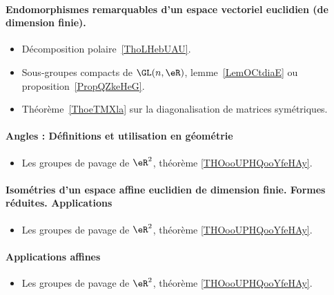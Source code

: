\paragraph{Endomorphismes remarquables d’un espace vectoriel euclidien (de dimension finie).}
\begin{itemize}
    \item Décomposition polaire~\ref{ThoLHebUAU}.
    \item Sous-groupes compacts de \( \GL(n,\eR)\), lemme~\ref{LemOCtdiaE} ou proposition~\ref{PropQZkeHeG}.
    \item Théorème~\ref{ThoeTMXla} sur la diagonalisation de matrices symétriques.
\end{itemize}
\paragraph{Angles : Définitions et utilisation en géométrie}
\begin{itemize}
    \item Les groupes de pavage de \( \eR^2\), théorème \ref{THOooUPHQooYfeHAy}.
\end{itemize}
\paragraph{Isométries d'un espace affine euclidien de dimension finie. Formes réduites. Applications}
\begin{itemize}
    \item Les groupes de pavage de \( \eR^2\), théorème \ref{THOooUPHQooYfeHAy}.
\end{itemize}
\paragraph{Applications affines}
\begin{itemize}
    \item Les groupes de pavage de \( \eR^2\), théorème \ref{THOooUPHQooYfeHAy}.
\end{itemize}
